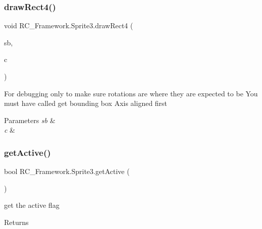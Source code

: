\subsubsection{\texorpdfstring{draw\+Rect4()}{drawRect4()}}
{\footnotesize\ttfamily void R\+C\+\_\+\+Framework.\+Sprite3.\+draw\+Rect4 (\begin{DoxyParamCaption}\item[{Sprite\+Batch}]{sb,  }\item[{Color}]{c }\end{DoxyParamCaption})}



For debugging only to make sure rotations are where they are expected to be You must have called get bounding box Axis aligned first 


\begin{DoxyParams}{Parameters}
{\em sb} & \\
\hline
{\em c} & \\
\hline
\end{DoxyParams}
\mbox{\label{class_r_c___framework_1_1_sprite3_af3c0f0e95f498147b74322f3ef919005}} 
\subsubsection{\texorpdfstring{get\+Active()}{getActive()}}
{\footnotesize\ttfamily bool R\+C\+\_\+\+Framework.\+Sprite3.\+get\+Active (\begin{DoxyParamCaption}{ }\end{DoxyParamCaption})}



get the active flag 

\begin{DoxyReturn}{Returns}

\end{DoxyReturn}
\mbox{\label{class_r_c___framework_1_1_sprite3_a376a1cca122797eb306bc81d31e91551}} 
